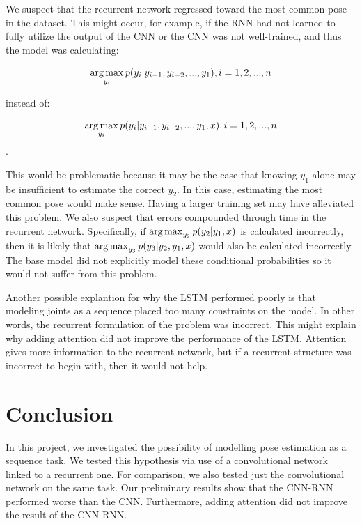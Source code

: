 \documentclass[11pt,twocolumn,letterpaper]{article}
\begin{document}
We suspect that the recurrent network regressed toward the most common
pose in the dataset. This might occur, for example, if the RNN had not
learned to fully utilize the output of the CNN or the CNN was not
well-trained, and thus the model was calculating:

$$\argmax_{y_i} p(y_i | y_{i-1}, y_{i-2},...,y_1), i = 1, 2,...,n$$

instead of:

$$\argmax_{y_i} p(y_i | y_{i-1}, y_{i-2},...,y_1, x), i = 1, 2,...,n$$.

This would be problematic because it may be the case that knowing $y_1$ alone
may be insufficient to estimate the correct $y_2$. In this case, estimating
the most common pose would make sense. Having a larger training 
set may have alleviated this problem. We also
suspect that errors compounded through time in the recurrent network. Specifically,
if $\argmax_{y_2} p(y_2 | y_{1}, x)$ is calculated incorrectly, then it
is likely that $\argmax_{y_3} p(y_3 | y_{2}, y_{1}, x)$ would 
also be calculated incorrectly. The base model did not explicitly
model these conditional probabilities so it would not suffer from this problem.

Another possible explantion for why the LSTM performed poorly is that 
modeling joints as a sequence placed too many constraints on the model.
In other words, the recurrent formulation of the problem was incorrect. 
This might explain why adding attention did not improve the performance
of the LSTM. Attention gives more information to the recurrent network,
but if a recurrent structure was incorrect to begin with, then it would not
help.


\section{Conclusion}

In this project, we investigated the possibility of modelling pose estimation
as a sequence task. We tested this hypothesis via use of a convolutional
network linked to a recurrent one. For comparison, we also
tested just the convolutional network on the same task. Our preliminary results show that 
the CNN-RNN performed worse than the CNN. 
Furthermore, adding attention did not improve the result of the
CNN-RNN.



\nocite{*}


\end{document}
